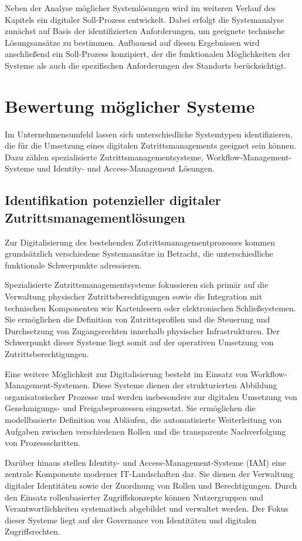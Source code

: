 \documentclass[
  12pt,
  a4paper,
  oneside,
  headings=normal,
  numbers=noendperiod
]{scrreprt}
\numberwithin{equation}{chapter}
\begin{document}
Neben der Analyse möglicher Systemlösungen wird im weiteren Verlauf des
Kapitels ein digitaler Soll-Prozess entwickelt. Dabei erfolgt die Systemanalyse
zunächst auf Basis der identifizierten Anforderungen, um geeignete technische
Lösungsansätze zu bestimmen. Aufbauend auf diesen Ergebnissen wird anschließend
ein Soll-Prozess konzipiert, der die funktionalen Möglichkeiten der Systeme als
auch die spezifischen Anforderungen des Standorts berücksichtigt.

\section{Bewertung möglicher Systeme}

Im Unternehmensumfeld lassen sich unterschiedliche Systemtypen identifizieren,
die für die Umsetzung eines digitalen Zutrittsmanagements geeignet sein können.
Dazu zählen spezialisierte Zutrittsmanagementsysteme,
Workflow-Management-Systeme und Identity- und Access-Management Lösungen.

\subsection{Identifikation potenzieller digitaler
Zutrittsmanagementlösungen}

Zur Digitalisierung des bestehenden Zutrittsmanagementprozesses kommen
grundsätzlich verschiedene Systemansätze in Betracht, die unterschiedliche
funktionale Schwerpunkte adressieren.

Spezialisierte Zutrittsmanagementsysteme fokussieren sich primär auf die
Verwaltung physischer Zutrittsberechtigungen sowie die Integration mit
technischen Komponenten wie Kartenlesern oder elektronischen Schließsystemen.
Sie ermöglichen die Definition von Zutrittsprofilen und die Steuerung und
Durchsetzung von Zugangsrechten innerhalb physischer Infrastrukturen. Der
Schwerpunkt dieser Systeme liegt somit auf der operativen Umsetzung von
Zutrittsberechtigungen.

Eine weitere Möglichkeit zur Digitalisierung besteht im Einsatz von
Workflow-Management-Systemen. Diese Systeme dienen der strukturierten Abbildung
organisatorischer Prozesse und werden insbesondere zur digitalen Umsetzung von
Genehmigungs- und Freigabeprozessen eingesetzt. Sie ermöglichen die
modellbasierte Definition von Abläufen, die automatisierte Weiterleitung von
Aufgaben zwischen verschiedenen Rollen und die transparente Nachverfolgung von
Prozessschritten.

Darüber hinaus stellen Identity- und Access-Management-Systeme (IAM) eine
zentrale Komponente moderner IT-Landschaften dar. Sie dienen der Verwaltung
digitaler Identitäten sowie der Zuordnung von Rollen und Berechtigungen. Durch
den Einsatz rollenbasierter Zugriffskonzepte können Nutzergruppen und
Verantwortlichkeiten systematisch abgebildet und verwaltet werden. Der Fokus
dieser Systeme liegt auf der Governance von Identitäten und digitalen
Zugriffsrechten.
\end{document}
